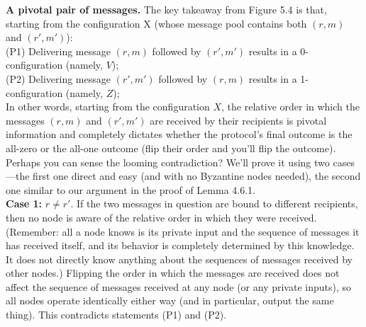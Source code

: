 \noindent
\textbf{A pivotal pair of messages.} The key takeaway from Figure 5.4 is that, starting from the
configuration X (whose message pool contains both $(r, m)$ and $(r', m')$):\\
\noindent
(P1) Delivering message $(r, m)$ followed by $(r', m')$ results in a 0-configuration (namely, $V$);\\
\noindent
(P2) Delivering message $(r', m')$ followed by $(r, m)$ results in a 1-configuration (namely, $Z$);\\

In other words, starting from the configuration $X$, the relative order in which the messages $(r, m)$ and $(r', m')$ are received by their recipients is pivotal information and completely
dictates whether the protocol’s final outcome is the all-zero or the all-one outcome (flip their
order and you’ll flip the outcome). Perhaps you can sense the looming contradiction? We’ll
prove it using two cases—the first one direct and easy (and with no Byzantine nodes needed),
the second one similar to our argument in the proof of Lemma 4.6.1.\\

\noindent
\textbf{Case 1:} $r \neq r'$. If the two messages in question are bound to different recipients, then
no node is aware of the relative order in which they were received. (Remember: all a node
knows is its private input and the sequence of messages it has received itself, and its behavior
is completely determined by this knowledge. It does not directly know anything about the
sequences of messages received by other nodes.) Flipping the order in which the messages
are received does not affect the sequence of messages received at any node (or any private
inputs), so all nodes operate identically either way (and in particular, output the same thing).
This contradicts statements (P1) and (P2).\\

